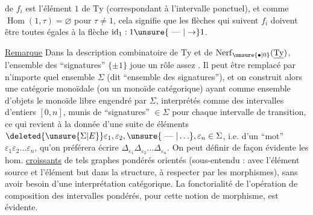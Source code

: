 

de $f_i$ est l'élément $1$ de $\mathrm{Ty}$ (correspondant à l'intervalle ponctuel), et comme $\operatorname{Hom}(1,\tau)=\varnothing$ pour $\tau\neq1$, cela signifie que les flèches qui suivent $f_i$ doivent être toutes égales à la flèche $\mathrm{id}_1:1\unsure{\text{ --- }|\to}1$.

\uline{Remarque} Dans la description combinatoire de $\underline{\mathrm{Ty}}$ et de $\operatorname{Nerf}_{\unsure{\bullet|0}}(\underline{\mathrm{Ty}})$, l'ensemble des ``signatures'' $\{\pm1\}$ joue un rôle assez . Il peut être remplacé par n'importe quel ensemble $\Sigma$ (dit ``ensemble des signatures''), et  on construit alors une catégorie monoïdale (ou un monoïde catégorique) ayant comme ensemble d'objets le monoïde libre engendré par $\Sigma$, interprétés comme des intervalles d'entiers $[0,n]$, munis de ``signatures'' $\in\Sigma$ pour chaque intervalle de transition,  ce qui revient à la donnée d'une suite  de  éléments $\deleted{\unsure{\Sigma|E}}\varepsilon_1,\varepsilon_2,\unsure{\text{ --- }|\ldots},\varepsilon_n\in\Sigma$, i.e. d'un ``mot'' $\varepsilon_1\varepsilon_2\ldots\varepsilon_n$, qu'on préférera écrire $\Delta_{\varepsilon_1}\Delta_{\varepsilon_2}\ldots\Delta_{\varepsilon_n}$. On peut définir de façon évidente les hom. \uline{croissants} de tels graphes pondérés orientés (sous-entendu : avec l'élément source et l'élément but dans la structure, à respecter par les morphismes), sans avoir besoin d'une interprétation catégorique. La fonctorialité de l'opération de composition des intervalles pondérés, pour cette notion de morphisme, est évidente. 
